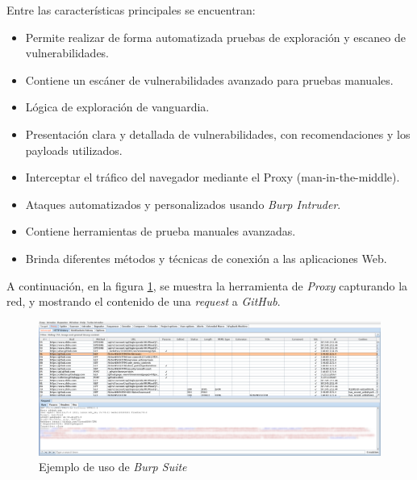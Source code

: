 Entre las características principales se encuentran:
\begin{itemize}
    \item Permite realizar de forma automatizada pruebas de exploración y escaneo de vulnerabilidades.
    \item Contiene un escáner de vulnerabilidades avanzado para pruebas manuales.
    \item Lógica de exploración de vanguardia.
    \item Presentación clara y detallada de vulnerabilidades, con recomendaciones y los payloads utilizados.
    \item Interceptar el tráfico del navegador mediante el Proxy (man-in-the-middle).
    \item Ataques automatizados y personalizados usando \textit{Burp Intruder}.
    \item Contiene herramientas de prueba manuales avanzadas.
    \item Brinda diferentes métodos y técnicas de conexión a las aplicaciones Web.
\end{itemize}

A continuación, en la figura \ref{fig:burp-example}, se muestra la herramienta de \textit{Proxy} capturando la red, y mostrando el contenido de una \textit{request} a \textit{GitHub}.

\begin{figure}[h]
    \centering
    \includegraphics[width=1.0\textwidth]{images/sections/tools/captura-burp.png}
    \caption{Ejemplo de uso de \textit{Burp Suite}}
    \label{fig:burp-example}
\end{figure}
